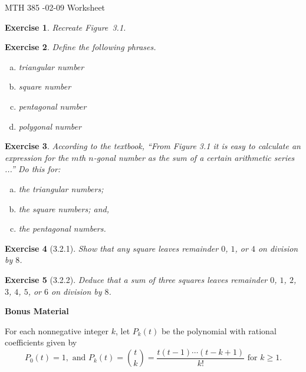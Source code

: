 \documentclass[12pt]{article}
\theoremstyle{plain}
\newtheorem{ex}{Exercise}
\begin{document}
MTH 385 -02-09 Worksheet

\begin{ex}
  Recreate Figure~3.1.
\end{ex}

\begin{ex}
  Define the following phrases.
  \begin{enumerate}[(a)]
    \item triangular number
    \item square number
    \item pentagonal number
    \item polygonal number
  \end{enumerate}
\end{ex}

\begin{ex}
  According to the textbook, ``From Figure 3.1 it is easy to calculate an expression for the $m$th $n$-gonal number as the sum of a certain arithmetic series ...'' Do this for:
  \begin{enumerate}[(a)]
    \item the triangular numbers;
    \item the square numbers; and,
    \item the pentagonal numbers.
  \end{enumerate}
\end{ex}

\begin{ex} [3.2.1]
  Show that any square leaves remainder $0$, $1$, or $4$ on division by $8$.
\end{ex}

\begin{ex} [3.2.2]
  Deduce that a sum of three squares leaves remainder $0$, $1$, $2$, $3$, $4$, $5$, or $6$ on division by $8$.
\end{ex}

\textbf{Bonus Material}

For each nonnegative integer $k$, let $P_k(t)$ be the polynomial with rational coefficients given by
\[
  P_0(t)=1,\text{ and }P_k(t)=\binom{t}{k}=\frac{t(t-1)\cdots(t-k+1)}{k!}\text{ for }k\geq1.
\]
\end{document}
